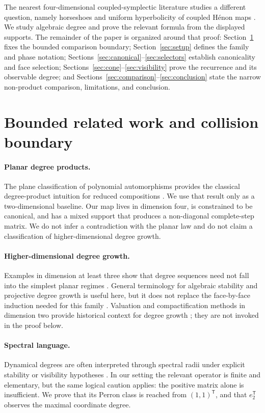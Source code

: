 \documentclass[11pt]{article}
\theoremstyle{remark}
\numberwithin{equation}{section}
\begin{document}
The nearest four-dimensional coupled-symplectic literature studies a different
question, namely horseshoes and uniform hyperbolicity of coupled Hénon maps
\citep{Fujioka2023}.  We study algebraic degree and prove the relevant formula
from the displayed supports.  The remainder of the paper is organized around
that proof: Section~\ref{sec:related} fixes the bounded comparison boundary;
Section~\ref{sec:setup} defines the family and phase notation;
Sections~\ref{sec:canonical}--\ref{sec:selectors} establish canonicality and
face selection; Sections~\ref{sec:cone}--\ref{sec:visibility} prove the
recurrence and its observable degree; and Sections~\ref{sec:comparison}--\ref{sec:conclusion}
state the narrow non-product comparison, limitations, and conclusion.

\section{Bounded related work and collision boundary}\label{sec:related}

\paragraph{Planar degree products.}
The plane classification of polynomial automorphisms provides the classical
degree-product intuition for reduced compositions
\citep{FriedlandMilnor1989}.  We use that result only as a two-dimensional
baseline.  Our map lives in dimension four, is constrained to be canonical, and
has a mixed support that produces a non-diagonal complete-step matrix.  We do
not infer a contradiction with the planar law and do not claim a classification
of higher-dimensional degree growth.

\paragraph{Higher-dimensional degree growth.}
Examples in dimension at least three show that degree sequences need not fall
into the simplest planar regimes \citep{Deserti2018}.  General terminology for
algebraic stability and projective degree growth is useful here, but it does
not replace the face-by-face induction needed for this family
\citep{GuedjSibony2002}.  Valuation and compactification methods in dimension
two provide historical context for degree growth
\citep{FavreJonsson2011}; they are not invoked in the proof below.

\paragraph{Spectral language.}
Dynamical degrees are often interpreted through spectral radii under explicit
stability or visibility hypotheses \citep{GuedjSibony2002,DangFavre2021}.  In
our setting the relevant operator is finite and elementary, but the same
logical caution applies: the positive matrix alone is insufficient.  We prove
that its Perron class is reached from \((1,1)^{\mathsf T}\), and that
\(e_2^{\mathsf T}\) observes the maximal coordinate degree.
\end{document}
